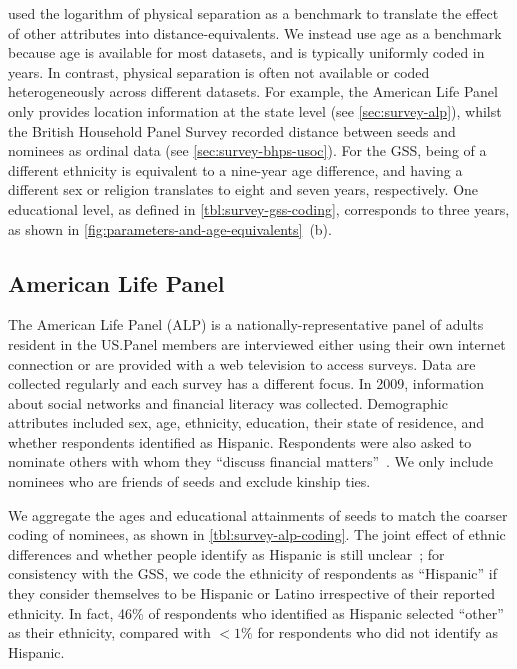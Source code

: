 \documentclass{scrartcl}
\begin{document}
\textcite{Hipp2009} used the logarithm of physical separation as a benchmark to translate the effect of other attributes into distance-equivalents. We instead use age as a benchmark because age is available for most datasets, and is typically uniformly coded in years. In contrast, physical separation is often not available or coded heterogeneously across different datasets. For example, the American Life Panel only provides location information at the state level (see \cref{sec:survey-alp}), whilst the British Household Panel Survey recorded distance between seeds and nominees as ordinal data (see \cref{sec:survey-bhps-usoc}). For the GSS, being of a different ethnicity is equivalent to a nine-year age difference, and having a different sex or religion translates to eight and seven years, respectively. One educational level, as defined in \cref{tbl:survey-gss-coding}, corresponds to three years, as shown in \cref{fig:parameters-and-age-equivalents}~(b).

\subsection{American Life Panel\label{sec:survey-alp}}

The American Life Panel (ALP) is a nationally-representative panel of adults resident in the US.\@ Panel members are interviewed either using their own internet connection or are provided with a web television to access surveys. Data are collected regularly and each survey has a different focus. In 2009, information about social networks and financial literacy was collected. Demographic attributes included sex, age, ethnicity, education, their state of residence, and whether respondents identified as Hispanic. Respondents were also asked to nominate others with whom they ``discuss financial matters''~\cite{Mihaly2009}. We only include nominees who are friends of seeds and exclude kinship ties.

We aggregate the ages and educational attainments of seeds to match the coarser coding of nominees, as shown in \cref{tbl:survey-alp-coding}. The joint effect of ethnic differences and whether people identify as Hispanic is still unclear~\cite{Smith2017a}; for consistency with the GSS, we code the ethnicity of respondents as ``Hispanic'' if they consider themselves to be Hispanic or Latino irrespective of their reported ethnicity. In fact, 46\% of respondents who identified as Hispanic selected ``other'' as their ethnicity, compared with $<1\%$ for respondents who did not identify as Hispanic.
\end{document}
